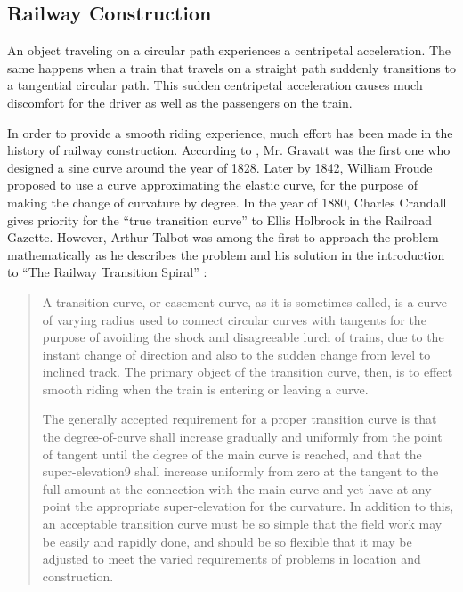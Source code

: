 \documentclass[12pt]{article}
\begin{document}
\FloatBarrier 
\subsection{Railway  Construction}

An object traveling on a circular path experiences a centripetal acceleration. The same happens when a train that travels on a straight path suddenly transitions to a tangential circular path. This sudden centripetal acceleration causes much discomfort for the driver as well as the passengers on the train. 

In order to provide a smooth riding experience, much effort has been made in the history of railway construction. According to \cite{Lev08}, Mr. Gravatt was the first one who designed a sine curve around the year of 1828. Later by 1842, William Froude proposed to use a curve approximating the elastic curve, for the purpose of making the change of curvature by degree. In the year of 1880, Charles Crandall gives priority for the ``true transition curve'' to Ellis Holbrook in the Railroad Gazette. However, Arthur Talbot was among the first to approach the problem mathematically as he describes the problem and his solution in the introduction to ``The Railway Transition Spiral'' \cite{Tal99}:

\begin{quotation}
	A transition curve, or easement curve, as it is sometimes called, is a curve of varying radius
	used to connect circular curves with tangents for the purpose of avoiding the shock and
	disagreeable lurch of trains, due to the instant change of direction and also to the sudden
	change from level to inclined track. The primary object of the transition curve, then, is to
	effect smooth riding when the train is entering or leaving a curve.
	
	The generally accepted requirement for a proper transition curve is that the degree-of-curve
	shall increase gradually and uniformly from the point of tangent until the degree of the main
	curve is reached, and that the super-elevation9
	shall increase uniformly from zero at the
	tangent to the full amount at the connection with the main curve and yet have at any point
	the appropriate super-elevation for the curvature. In addition to this, an acceptable transition
	curve must be so simple that the field work may be easily and rapidly done, and should be so
	flexible that it may be adjusted to meet the varied requirements of problems in location and
	construction.
\end{quotation}
\end{document}
